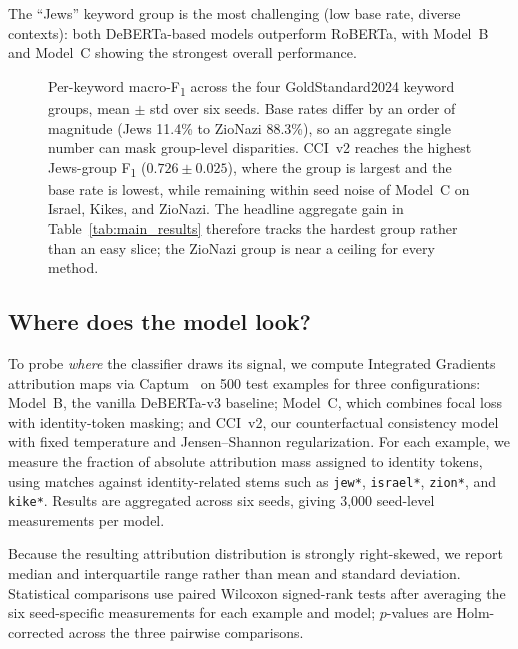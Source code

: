 \documentclass[10pt,a4paper]{article}
\begin{document}
The ``Jews'' keyword group is the most challenging (low base rate, diverse contexts): both DeBERTa-based models outperform RoBERTa, with Model~B and Model~C showing the strongest overall performance.

\begin{figure}[h]
\centering
\caption{Per-keyword macro-F\textsubscript{1} across the four GoldStandard2024 keyword groups, mean $\pm$ std over six seeds. Base rates differ by an order of magnitude (Jews 11.4\% to ZioNazi 88.3\%), so an aggregate single number can mask group-level disparities. CCI~v2 reaches the highest Jews-group F\textsubscript{1} ($0.726 \pm 0.025$), where the group is largest and the base rate is lowest, while remaining within seed noise of Model~C on Israel, Kikes, and ZioNazi. The headline aggregate gain in Table~\ref{tab:main_results} therefore tracks the hardest group rather than an easy slice; the ZioNazi group is near a ceiling for every method.}
\label{fig:per_keyword_heatmap}
\end{figure}

\subsection{Where does the model look?}
\label{sec:attribution}

To probe \emph{where} the classifier draws its signal, we compute Integrated Gradients~\citep{sundararajan2017axiomatic} attribution maps via Captum~\citep{kokhlikyan2020captum} on 500 test examples for three configurations: Model~B, the vanilla DeBERTa-v3 baseline; Model~C, which combines focal loss with identity-token masking; and CCI~v2, our counterfactual consistency model with fixed temperature and Jensen--Shannon regularization. For each example, we measure the fraction of absolute attribution mass assigned to identity tokens, using matches against identity-related stems such as \texttt{jew*}, \texttt{israel*}, \texttt{zion*}, and \texttt{kike*}. Results are aggregated across six seeds, giving 3{,}000 seed-level measurements per model.

Because the resulting attribution distribution is strongly right-skewed, we report median and interquartile range rather than mean and standard deviation. Statistical comparisons use paired Wilcoxon signed-rank tests after averaging the six seed-specific measurements for each example and model; $p$-values are Holm-corrected across the three pairwise comparisons.
\end{document}
